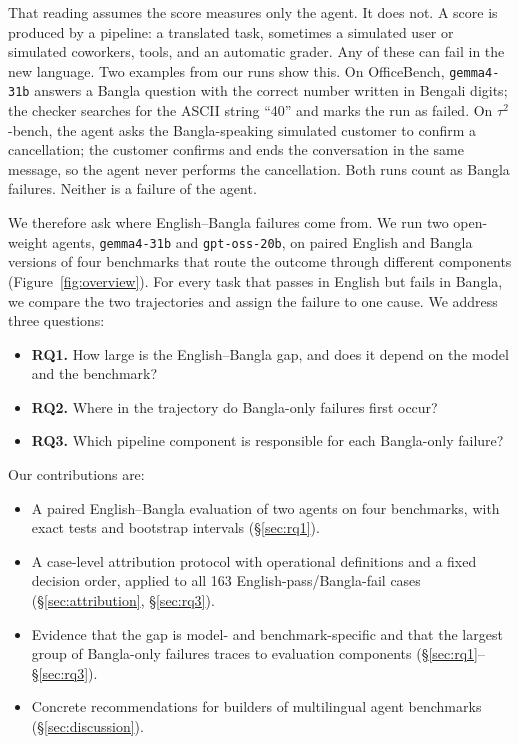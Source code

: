 \documentclass[11pt]{article}
\newcommand{\gemma}{\texttt{gemma4-31b}}
\newcommand{\gptoss}{\texttt{gpt-oss-20b}}
\newcommand{\OB}{OfficeBench}
\newcommand{\TAU}{$\tau^2$-bench}
\begin{document}
That reading assumes the score measures only the agent. It does not. A score is produced by a
pipeline: a translated task, sometimes a simulated user or simulated coworkers, tools, and an
automatic grader. Any of these can fail in the new language. Two examples from our runs show
this. On \OB{}, \gemma{} answers a Bangla question with the correct number written in Bengali
digits; the checker searches for the ASCII string ``40'' and marks the run as failed. On \TAU{},
the agent asks the Bangla-speaking simulated customer to confirm a cancellation; the customer
confirms and ends the conversation in the same message, so the agent never performs the
cancellation. Both runs count as Bangla failures. Neither is a failure of the agent.

We therefore ask where English--Bangla failures come from. We run two open-weight agents,
\gemma{} and \gptoss{}, on paired English and Bangla versions of four benchmarks that route the
outcome through different components (Figure~\ref{fig:overview}). For every task that passes in
English but fails in Bangla, we compare the two trajectories and assign the failure to one cause.
We address three questions:

\begin{itemize}[noitemsep,topsep=2pt,leftmargin=*]
\item \textbf{RQ1.} How large is the English--Bangla gap, and does it depend on the model and the
benchmark?
\item \textbf{RQ2.} Where in the trajectory do Bangla-only failures first occur?
\item \textbf{RQ3.} Which pipeline component is responsible for each Bangla-only failure?
\end{itemize}

\noindent Our contributions are:
\begin{itemize}[noitemsep,topsep=2pt,leftmargin=*]
\item A paired English--Bangla evaluation of two agents on four benchmarks, with exact tests
and bootstrap intervals (\S\ref{sec:rq1}).
\item A case-level attribution protocol with operational definitions and a fixed decision order,
applied to all 163 English-pass/Bangla-fail cases (\S\ref{sec:attribution}, \S\ref{sec:rq3}).
\item Evidence that the gap is model- and benchmark-specific and that the largest group of
Bangla-only failures traces to evaluation components (\S\ref{sec:rq1}--\S\ref{sec:rq3}).
\item Concrete recommendations for builders of multilingual agent benchmarks (\S\ref{sec:discussion}).
\end{itemize}
\end{document}
